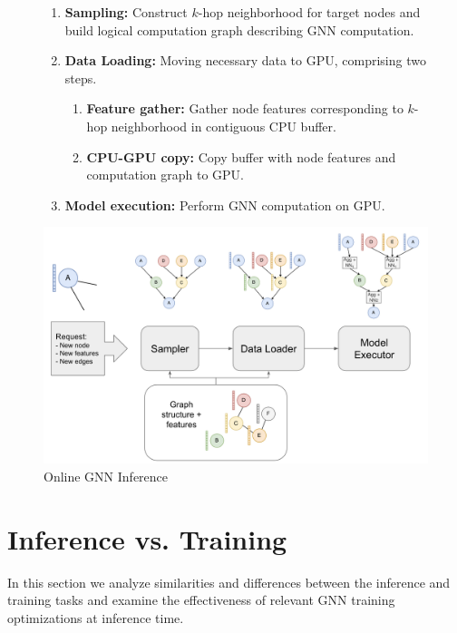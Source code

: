 \begin{figure}[h!!!]
    \centering
    \begin{enumerate}
        \item \textbf{Sampling:} Construct $k$-hop neighborhood for target nodes and build logical computation graph describing GNN computation.
        \item \textbf{Data Loading:} Moving necessary data to GPU, comprising two steps.
        \begin{enumerate}
            \item \textbf{Feature gather:} Gather node features corresponding to $k$-hop neighborhood in contiguous CPU buffer.
            \item \textbf{CPU-GPU copy:} Copy buffer with node features and computation graph to GPU.
        \end{enumerate}
        \item \textbf{Model execution:} Perform GNN computation on GPU.
    \end{enumerate}
    \includegraphics[width=\textwidth]{figures/Compute example.png}
    
    \caption{Online GNN Inference}
    \label{Compute Visualization}
\end{figure}    


\section{Inference vs. Training} \label{Background: Relation to training}
In this section we analyze similarities and differences between the inference and training tasks and examine the effectiveness of relevant GNN training optimizations at inference time.

